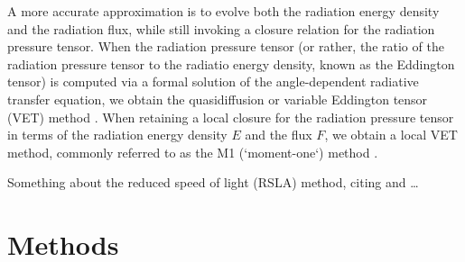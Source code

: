 \documentclass[fleqn,usenatbib]{mnras}
\begin{document}
A more accurate approximation is to evolve both the radiation energy density and the radiation flux, while still invoking a closure relation for the radiation pressure tensor. When the radiation pressure tensor (or rather, the ratio of the radiation pressure tensor to the radiatio energy density, known as the Eddington tensor) is computed via a formal solution of the angle-dependent radiative transfer equation, we obtain the quasidiffusion or variable Eddington tensor (VET) method \citep{Goldin_1964}. When retaining a local closure for the radiation pressure tensor in terms of the radiation energy density $E$ and the flux $F$, we obtain a local VET method, commonly referred to as the M1 (`moment-one`) method \citep{Minerbo_1978,Levermore_1984,Dubroca_1999,Gonzalez_2007}.

Something about the reduced speed of light (RSLA) method, citing \cite{Gnedin_2001} and \cite{Skinner_2013}\dots


\section{Methods}
\label{section:methods}
\end{document}

